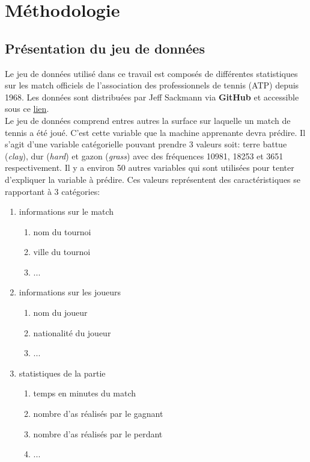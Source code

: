 \section{Méthodologie}

\subsection{Présentation du jeu de données}
Le jeu de données utilisé dans ce travail est composés de différentes statistiques sur les match officiels de l'association des professionnels de tennis (ATP) depuis 1968. Les données sont distribuées par Jeff Sackmann via \textbf{GitHub} et accessible sous ce \href{https://github.com/JeffSackmann/tennis_atp}{lien}.\\

Le jeu de données comprend entres autres la surface sur laquelle un match de tennis a été joué. C'est cette variable que la machine apprenante devra prédire. Il s'agit d'une variable catégorielle pouvant prendre 3 valeurs soit: terre battue (\textit{clay}), dur (\textit{hard}) et gazon (\textit{grass}) avec des fréquences 10981, 18253 et 3651 respectivement. Il y a environ 50 autres variables qui sont utilisées pour tenter d'expliquer la variable à prédire. Ces valeurs représentent des caractéristiques se rapportant à 3 catégories:

\begin{enumerate}
  \item informations sur le match
    \begin{enumerate}
      \item nom du tournoi
      \item ville du tournoi
      \item ...
    \end{enumerate}
  \item informations sur les joueurs
    \begin{enumerate}
      \item nom du joueur
      \item nationalité du joueur
      \item ...
    \end{enumerate}
  \item statistiques de la partie
    \begin{enumerate}
      \item temps en minutes du match
      \item nombre d'as réalisés par le gagnant
      \item nombre d'as réalisés par le perdant
      \item ...
    \end{enumerate}
\end{enumerate}

